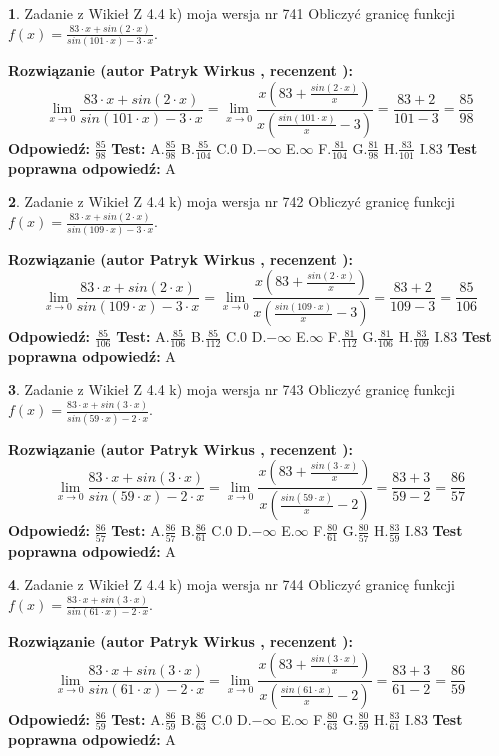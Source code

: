 \documentclass[12pt, a4paper]{article}
\theoremstyle{definition} %
\newtheorem{zad}{}
\newcommand{\zadStart}[1]{\begin{zad}#1\newline}
\newcommand{\zadStop}{\end{zad}}
\newcommand{\rozwStart}[2]{\noindent \textbf{Rozwiązanie (autor #1 , recenzent #2): }\newline}
\newcommand{\rozwStop}{\newline}
\newcommand{\odpStart}{\noindent \textbf{Odpowiedź:}\newline}
\newcommand{\odpStop}{\newline}
\newcommand{\testStart}{\noindent \textbf{Test:}\newline}
\newcommand{\testStop}{\newline}
\newcommand{\kluczStart}{\noindent \textbf{Test poprawna odpowiedź:}\newline}
\newcommand{\kluczStop}{\newline}
\begin{document}
\zadStart{Zadanie z Wikieł Z 4.4 k) moja wersja nr 741}
Obliczyć granicę funkcji $f(x)=\frac{83\cdot x +sin(2\cdot x)}{sin(101\cdot x) -3\cdot x}$.
\zadStop
\rozwStart{Patryk Wirkus}{}
$$\lim\limits_{x\to 0}\frac{83\cdot x +sin(2\cdot x)}{sin(101\cdot x) -3\cdot x}
=\lim\limits_{x\to 0}\frac{x(83+\frac{sin(2\cdot x)}{x})}{x(\frac{sin(101\cdot x)}{x}-3)}
=\frac{83+2}{101-3} = \frac{85}{98}$$
\rozwStop
\odpStart
$\frac{85}{98}$
\odpStop
\testStart
A.$\frac{85}{98}$
B.$\frac{85}{104}$
C.$0$
D.$-\infty$
E.$\infty$
F.$\frac{81}{104}$
G.$\frac{81}{98}$
H.$\frac{83}{101}$
I.$83$
\testStop
\kluczStart
A
\kluczStop



\zadStart{Zadanie z Wikieł Z 4.4 k) moja wersja nr 742}
Obliczyć granicę funkcji $f(x)=\frac{83\cdot x +sin(2\cdot x)}{sin(109\cdot x) -3\cdot x}$.
\zadStop
\rozwStart{Patryk Wirkus}{}
$$\lim\limits_{x\to 0}\frac{83\cdot x +sin(2\cdot x)}{sin(109\cdot x) -3\cdot x}
=\lim\limits_{x\to 0}\frac{x(83+\frac{sin(2\cdot x)}{x})}{x(\frac{sin(109\cdot x)}{x}-3)}
=\frac{83+2}{109-3} = \frac{85}{106}$$
\rozwStop
\odpStart
$\frac{85}{106}$
\odpStop
\testStart
A.$\frac{85}{106}$
B.$\frac{85}{112}$
C.$0$
D.$-\infty$
E.$\infty$
F.$\frac{81}{112}$
G.$\frac{81}{106}$
H.$\frac{83}{109}$
I.$83$
\testStop
\kluczStart
A
\kluczStop



\zadStart{Zadanie z Wikieł Z 4.4 k) moja wersja nr 743}
Obliczyć granicę funkcji $f(x)=\frac{83\cdot x +sin(3\cdot x)}{sin(59\cdot x) -2\cdot x}$.
\zadStop
\rozwStart{Patryk Wirkus}{}
$$\lim\limits_{x\to 0}\frac{83\cdot x +sin(3\cdot x)}{sin(59\cdot x) -2\cdot x}
=\lim\limits_{x\to 0}\frac{x(83+\frac{sin(3\cdot x)}{x})}{x(\frac{sin(59\cdot x)}{x}-2)}
=\frac{83+3}{59-2} = \frac{86}{57}$$
\rozwStop
\odpStart
$\frac{86}{57}$
\odpStop
\testStart
A.$\frac{86}{57}$
B.$\frac{86}{61}$
C.$0$
D.$-\infty$
E.$\infty$
F.$\frac{80}{61}$
G.$\frac{80}{57}$
H.$\frac{83}{59}$
I.$83$
\testStop
\kluczStart
A
\kluczStop



\zadStart{Zadanie z Wikieł Z 4.4 k) moja wersja nr 744}
Obliczyć granicę funkcji $f(x)=\frac{83\cdot x +sin(3\cdot x)}{sin(61\cdot x) -2\cdot x}$.
\zadStop
\rozwStart{Patryk Wirkus}{}
$$\lim\limits_{x\to 0}\frac{83\cdot x +sin(3\cdot x)}{sin(61\cdot x) -2\cdot x}
=\lim\limits_{x\to 0}\frac{x(83+\frac{sin(3\cdot x)}{x})}{x(\frac{sin(61\cdot x)}{x}-2)}
=\frac{83+3}{61-2} = \frac{86}{59}$$
\rozwStop
\odpStart
$\frac{86}{59}$
\odpStop
\testStart
A.$\frac{86}{59}$
B.$\frac{86}{63}$
C.$0$
D.$-\infty$
E.$\infty$
F.$\frac{80}{63}$
G.$\frac{80}{59}$
H.$\frac{83}{61}$
I.$83$
\testStop
\kluczStart
A
\kluczStop
\end{document}

